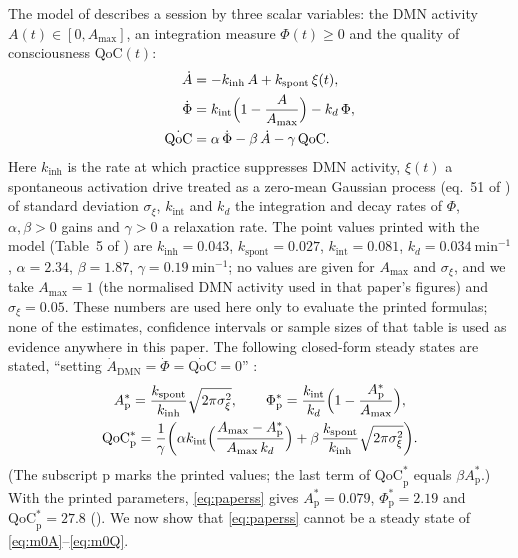 \documentclass[12pt,a4paper]{article}
\theoremstyle{plain}
\theoremstyle{definition}
\theoremstyle{remark}
\newcommand{\QoC}{\mathrm{QoC}}
\newcommand{\kinh}{k_{\mathrm{inh}}}
\newcommand{\kint}{k_{\mathrm{int}}}
\newcommand{\kd}{k_{d}}
\newcommand{\kspont}{k_{\mathrm{spont}}}
\newcommand{\Amax}{A_{\max}}
\begin{document}
The model of \citet[eqs.~52--54]{BQI} describes a session by three scalar variables: the DMN activity $A(t)\in[0,\Amax]$, an integration measure $\Phi(t)\ge 0$ and the quality of consciousness $\QoC(t)$:
\begin{align}
  \dot A    &= -\kinh\,A + \kspont\,\xi(t), \label{eq:m0A}\\
  \dot \Phi &= \kint\Bigl(1-\frac{A}{\Amax}\Bigr) - \kd\,\Phi, \label{eq:m0Phi}\\
  \dot{\QoC} &= \alpha\,\dot\Phi - \beta\,\dot A - \gamma\,\QoC. \label{eq:m0Q}
\end{align}
Here $\kinh$ is the rate at which practice suppresses DMN activity, $\xi(t)$ a spontaneous activation drive treated as a zero-mean Gaussian process (eq.~51 of \citealp{BQI}) of standard deviation $\sigma_\xi$, $\kint$ and $\kd$ the integration and decay rates of $\Phi$, $\alpha,\beta>0$ gains and $\gamma>0$ a relaxation rate. The point values printed with the model (Table~5 of \citealp{BQI}) are $\kinh=0.043$, $\kspont=0.027$, $\kint=0.081$, $\kd=0.034\ \mathrm{min^{-1}}$, $\alpha=2.34$, $\beta=1.87$, $\gamma=0.19\ \mathrm{min^{-1}}$; no values are given for $\Amax$ and $\sigma_\xi$, and we take $\Amax=1$ (the normalised DMN activity used in that paper's figures) and $\sigma_\xi=0.05$. These numbers are used here only to evaluate the printed formulas; none of the estimates, confidence intervals or sample sizes of that table is used as evidence anywhere in this paper. The following closed-form steady states are stated, ``setting $\dot A_{\mathrm{DMN}}=\dot\Phi=\dot{\QoC}=0$'' \citep[eqs.~55--57]{BQI}:
\begin{equation}
\begin{gathered}
  A^*_{\mathrm{p}}=\frac{\kspont}{\kinh}\sqrt{2\pi\sigma_\xi^2},\qquad
  \Phi^*_{\mathrm{p}}=\frac{\kint}{\kd}\Bigl(1-\frac{A^*_{\mathrm{p}}}{\Amax}\Bigr),\\
  \QoC^*_{\mathrm{p}}=\frac{1}{\gamma}\biggl(\alpha\kint\Bigl(\frac{\Amax-A^*_{\mathrm{p}}}{\Amax\,\kd}\Bigr)+\beta\,\frac{\kspont}{\kinh}\sqrt{2\pi\sigma_\xi^2}\biggr).
\end{gathered}
  \label{eq:paperss}
\end{equation}
(The subscript p marks the printed values; the last term of $\QoC^*_{\mathrm p}$ equals $\beta A^*_{\mathrm p}$.)
With the printed parameters, \eqref{eq:paperss} gives $A^*_{\mathrm p}=0.079$, $\Phi^*_{\mathrm p}=2.19$ and $\QoC^*_{\mathrm p}=27.8$ (). We now show that \eqref{eq:paperss} cannot be a steady state of \eqref{eq:m0A}--\eqref{eq:m0Q}.
\end{document}
